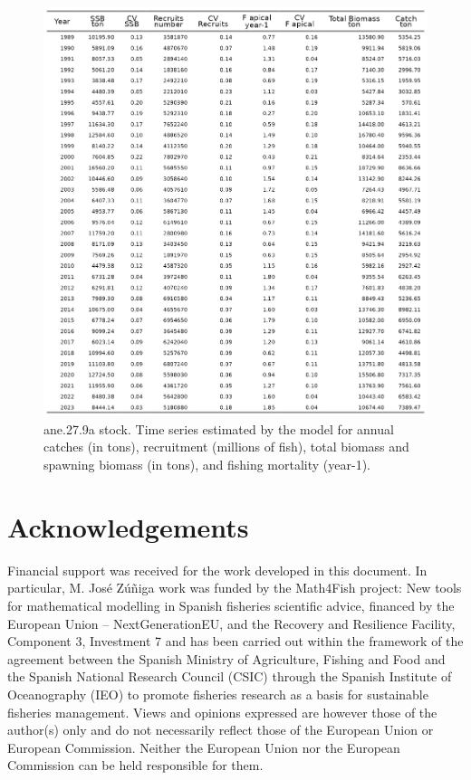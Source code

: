 \documentclass[
]{article}
\begin{document}
\begin{figure}[H]

{\centering \includegraphics[width=0.95\linewidth]{report/run/S1.0_4FLEETS/tb_timeseries} 

}

\caption{ane.27.9a stock. Time series estimated by the model for annual catches (in tons), recruitment (millions of fish), total biomass and spawning biomass (in tons), and fishing mortality (year-1).}\label{fig:unnamed-chunk-35}
\end{figure}

\hypertarget{acknowledgements}{%
\section{Acknowledgements}\label{acknowledgements}}

Financial support was received for the work developed in this document.
In particular, M. José Zúñiga work was funded by the Math4Fish project:
New tools for mathematical modelling in Spanish fisheries scientific
advice, financed by the European Union -- NextGenerationEU, and the
Recovery and Resilience Facility, Component 3, Investment 7 and has been
carried out within the framework of the agreement between the Spanish
Ministry of Agriculture, Fishing and Food and the Spanish National
Research Council (CSIC) through the Spanish Institute of Oceanography
(IEO) to promote fisheries research as a basis for sustainable fisheries
management. Views and opinions expressed are however those of the
author(s) only and do not necessarily reflect those of the European
Union or European Commission. Neither the European Union nor the
European Commission can be held responsible for them.
\end{document}
